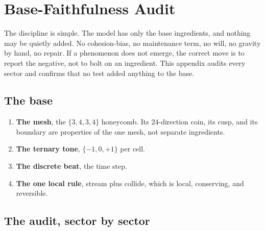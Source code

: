 \section{Base-Faithfulness Audit}

The discipline is simple. The model has only the base ingredients, and nothing may be quietly added. No
cohesion-bias, no maintenance term, no will, no gravity by hand, no repair. If a phenomenon does not emerge, the
correct move is to report the negative, not to bolt on an ingredient. This appendix audits every sector and
confirms that no test added anything to the base.

\subsection{The base}

\begin{enumerate}
  \item \textbf{The mesh}, the $\{3,4,3,4\}$ honeycomb. Its 24-direction coin, its cusp, and its boundary are
  properties of the one mesh, not separate ingredients.
  \item \textbf{The ternary tone}, $\{-1, 0, +1\}$ per cell.
  \item \textbf{The discrete beat}, the time step.
  \item \textbf{The one local rule}, stream plus collide, which is local, conserving, and reversible.
\end{enumerate}

\subsection{The audit, sector by sector}

